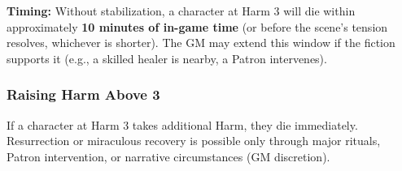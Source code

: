 \textbf{Timing:} Without stabilization, a character at Harm 3 will die within approximately \textbf{10 minutes of in-game time} (or before the scene's tension resolves, whichever is shorter). The GM may extend this window if the fiction supports it (e.g., a skilled healer is nearby, a Patron intervenes).

\subsubsection{Raising Harm Above 3}
If a character at Harm 3 takes additional Harm, they die immediately. Resurrection or miraculous recovery is possible only through major rituals, Patron intervention, or narrative circumstances (GM discretion).